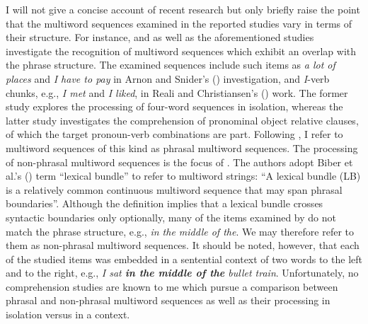 I will not give a concise account of recent research but only briefly raise the point that the multiword sequences examined in the reported studies vary in terms of their structure. For instance, \citet{reali-christiansen} and \citet{arnon-snider} as well as the aforementioned studies investigate the recognition of multiword sequences which exhibit an overlap with the phrase structure. The examined sequences include such items as \textit{a lot of places} and \textit{I have to pay} in Arnon and Snider's (\citeyear{arnon-snider}) investigation, and \textit{I}-verb chunks, e.g., \textit{I met} and \textit{I liked}, in Reali and Christiansen's (\citeyear{reali-christiansen}) work. The former study explores the processing of four-word sequences in isolation, whereas the latter study investigates the comprehension of pronominal object relative clauses, of which the target pronoun-verb combinations are part. Following \citet{tremblay-baayen}, I refer to multiword sequences of this kind as phrasal multiword sequences. The processing of non-phrasal multiword sequences is the focus of \citet{tremblay-etal11}. The authors adopt Biber et al.'s (\citeyear{biber-etal-1999}) term “lexical bundle” to refer to multiword strings: ``A lexical bundle (LB) is a relatively common continuous multiword sequence that may span phrasal boundaries''. Although the definition implies that a lexical bundle crosses syntactic boundaries only optionally, many of the items examined by \citeauthor{tremblay-etal11} do not match the phrase structure, e.g., \textit{in the middle of the}. We may therefore refer to them as non-phrasal multiword sequences. It should be noted, however, that each of the studied items was embedded in a sentential context of two words to the left and to the right, e.g., \textit{I sat \textbf{in the middle of the} bullet train}. Unfortunately, no comprehension studies are known to me which pursue a comparison between phrasal and non-phrasal multiword sequences as well as their processing in isolation versus in a context.

